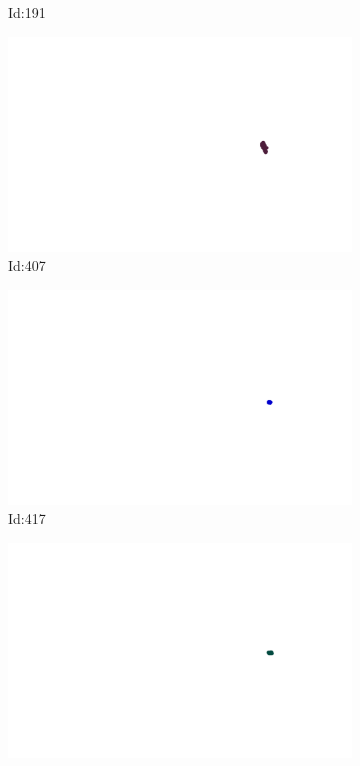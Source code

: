 \documentclass[12pt,twoside]{report}
\begin{document}
\begin{figure}
\begin{subfigure}[b]{0.20\textwidth}
\caption{Id:191}
\end{subfigure}
\begin{subfigure}[b]{0.20\textwidth}
\centering
\includegraphics[width=\textwidth]{../../trajectories/407.png}
\caption{Id:407}
\end{subfigure}
\begin{subfigure}[b]{0.20\textwidth}
\centering
\includegraphics[width=\textwidth]{../../trajectories/417.png}
\caption{Id:417}
\end{subfigure}
\begin{subfigure}[b]{0.20\textwidth}
\centering
\includegraphics[width=\textwidth]{../../trajectories/423.png}

\end{subfigure}
\end{figure}
\end{document}

